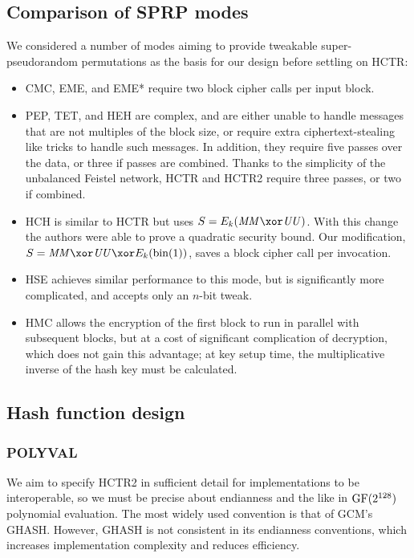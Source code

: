 \documentclass[hctr2.tex]{subfiles}
\begin{document}
\subsection{Comparison of SPRP modes}
We considered a number of modes aiming to provide
tweakable super-pseudorandom permutations
as the basis for our design before settling on HCTR:
\begin{itemize}
    \item CMC\cite{cmc}, EME\cite{eme}, and EME*\cite{emestar}
    require two block cipher calls per input block.
    \item PEP\cite{pep}, TET\cite{tet}, and HEH\cite{heh} are 
    complex, and are either
    unable to handle messages that are not multiples of the
    block size, or require extra ciphertext-stealing like tricks
    to handle such messages.
    In addition, they require five passes over the data,
    or three if passes are combined.
    Thanks to the simplicity of the unbalanced Feistel network,
    HCTR and HCTR2 require three passes, or two if combined.
    \item HCH\cite{hch} is similar to HCTR
    but uses \(S = E_k(\MM \xor \UU)\).
    With this change the authors were able to prove a
    quadratic security bound. Our modification,
    \(S = \MM \xor \UU \xor E_k(\fromint(1))\), saves
    a block cipher call per invocation.
    \item HSE\cite{hse} achieves similar performance to
    this mode, but is significantly more complicated,
    and accepts only an \(n\)-bit tweak.
    \item HMC\cite{hmc} allows the encryption of the
    first block to run in parallel with subsequent blocks,
    but at a cost of significant complication of decryption,
    which does not gain this advantage;
    at key setup time, the multiplicative inverse of
    the hash key must be calculated.
\end{itemize}

\subsection{Hash function design}\label{hashdesign}

\subsubsection{POLYVAL}\label{choosingpolyval}

We aim to specify HCTR2 in sufficient detail
for implementations to be interoperable,
so we must be precise about endianness and the like
in \(\operatorname{GF}(2^{128})\) polynomial evaluation.
The most widely used  convention is that of GCM's GHASH\cite{gcm}.
However, GHASH is not consistent in its endianness conventions,
which increases implementation complexity and reduces efficiency.
\end{document}
